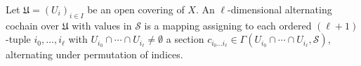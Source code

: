 Let $\mathfrak{U} = (U_i)_{i \in I}$ be an open covering of $X$. An $\ell$-dimensional alternating cochain over $\mathfrak{U}$ with values in $\mathcal{S}$ is a mapping assigning to each ordered $(\ell+1)$-tuple $i_0, \ldots, i_\ell$ with $U_{i_0} \cap \cdots \cap U_{i_\ell} \neq \emptyset$ a section $c_{i_0 \ldots i_\ell} \in \Gamma(U_{i_0} \cap \cdots \cap U_{i_\ell}, \mathcal{S})$, alternating under permutation of indices.

